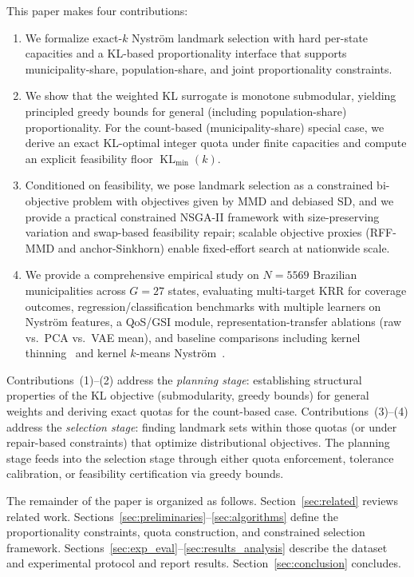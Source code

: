 \documentclass[10pt,journal]{IEEEtran}
\newcommand{\datasetN}{5569}              %
\newcommand{\1}{\mathbf{1}}
\DeclareMathOperator{\KL}{KL}
\theoremstyle{ieeethm}
\begin{document}
This paper makes four contributions:
\begin{enumerate}
    \item We formalize exact-$k$ Nyström landmark selection with hard per-state capacities and a KL-based proportionality interface
    that supports municipality-share, population-share, and joint proportionality constraints.
    \item We show that the weighted KL surrogate is monotone submodular, yielding principled greedy bounds for general (including population-share) proportionality. For the count-based (municipality-share) special case, we derive an exact KL-optimal integer quota under finite capacities and compute an explicit feasibility floor $\KL_{\min}(k)$.
    \item Conditioned on feasibility, we pose landmark selection as a constrained bi-objective problem with objectives given by MMD
    and debiased SD, and we provide a practical constrained NSGA-II framework with size-preserving variation and
    swap-based feasibility repair; scalable objective proxies (RFF-MMD and anchor-Sinkhorn) enable fixed-effort search at nationwide scale.
    \item We provide a comprehensive empirical study on $N=\datasetN$ Brazilian municipalities across $G=27$ states, evaluating multi-target KRR for coverage outcomes, regression/classification benchmarks with multiple learners on Nyström features, a QoS/GSI module, representation-transfer ablations (raw vs.\ PCA vs.\ VAE mean), and baseline comparisons including kernel thinning~\cite{dwivedi2024kernelthinning} and kernel $k$-means Nyström~\cite{he_zhang_2018}.
\end{enumerate}
Contributions~(1)--(2) address the \emph{planning stage}: establishing structural properties
of the KL objective (submodularity, greedy bounds) for general weights and deriving exact
quotas for the count-based case. Contributions~(3)--(4) address the \emph{selection stage}:
finding landmark sets within those quotas (or under repair-based constraints) that optimize
distributional objectives. The planning stage feeds into the selection stage through either
quota enforcement, tolerance calibration, or feasibility certification via greedy bounds.

The remainder of the paper is organized as follows. Section~\ref{sec:related} reviews related
work. Sections~\ref{sec:preliminaries}--\ref{sec:algorithms} define the proportionality
constraints, quota construction, and constrained selection framework.
Sections~\ref{sec:exp_eval}--\ref{sec:results_analysis} describe the dataset and experimental
protocol and report results. Section~\ref{sec:conclusion} concludes.
\end{document}
